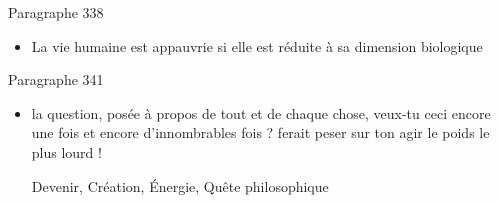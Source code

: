 \documentclass[french,a4paper,11pt,answers]{exam}
\newcommand{\cit}[2]{\og #1 \fg{} \begin{solution}{ #2 }\end{solution}} %
\begin{document}
	\begin{cadre}{Paragraphe 338}
		\begin{itemize}
			\item \cit{}
				{La vie humaine est appauvrie si elle est réduite à sa dimension biologique}
		\end{itemize}
	\end{cadre}
	
	\begin{cadre}{Paragraphe 341}
		\begin{itemize}
			\item \cit{la question, posée à propos de tout et de chaque chose, \og veux-tu ceci encore une fois et encore d'innombrables fois ? \fg{} ferait peser sur ton agir le poids le plus lourd !}
				{Devenir, Création, Énergie, Quête philosophique}
		\end{itemize}
	\end{cadre}
\end{document}

